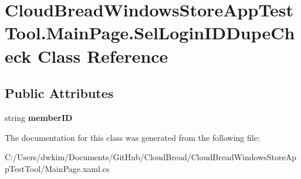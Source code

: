 \hypertarget{a00176}{}\section{Cloud\+Bread\+Windows\+Store\+App\+Test\+Tool.\+Main\+Page.\+Sel\+Login\+I\+D\+Dupe\+Check Class Reference}
\label{a00176}
\subsection*{Public Attributes}
\begin{DoxyCompactItemize}
\item 
string {\bfseries member\+ID}\hypertarget{a00176_a9671b10db758dd484f5ddbbcdd73dcea}{}\label{a00176_a9671b10db758dd484f5ddbbcdd73dcea}

\end{DoxyCompactItemize}


The documentation for this class was generated from the following file\+:\begin{DoxyCompactItemize}
\item 
C\+:/\+Users/dwkim/\+Documents/\+Git\+Hub/\+Cloud\+Bread/\+Cloud\+Bread\+Windows\+Store\+App\+Test\+Tool/Main\+Page.\+xaml.\+cs\end{DoxyCompactItemize}
